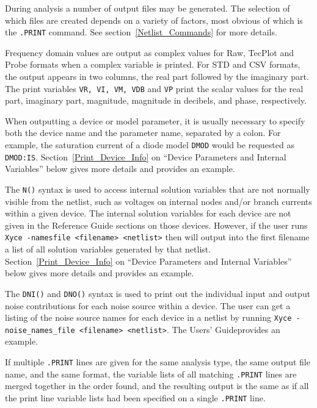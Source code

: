 \begin{Command}
\begin{XyceItemize}
\item During analysis a number of output files may be generated.  The
  selection of which files are created depends on a variety of factors,
  most obvious of which is the \texttt{.PRINT} command. See
  section~\ref{Netlist_Commands} for more details.

\item Frequency domain values are output as complex values for Raw,
  TecPlot and Probe formats when a complex variable is printed.  For STD
  and CSV formats, the output appears in two columns, the real part
  followed by the imaginary part.  The print variables 
  \texttt{VR, VI, VM, VDB} and \texttt{VP} print the scalar values 
  for the real part, imaginary part,
  magnitude, magnitude in decibels, and phase, respectively.

\item When outputting a device or model parameter, it is usually
  necessary to specify both the device name and the parameter name,
  separated by a colon.  For example, the saturation current of a
  diode model \texttt{DMOD} would be requested
  as \texttt{DMOD:IS}. Section~\ref{Print_Device_Info} on ``Device
  Parameters and Internal Variables'' below gives more details and
  provides an example.

\item The \texttt{N()} syntax is used to access internal solution variables 
that are not normally visible from the netlist, such as voltages on
internal nodes and/or branch currents within a given device.  The
internal solution variables for each \Xyce{} device are not given in
the Reference Guide sections on those devices.  However, if the user
runs \texttt{Xyce -namesfile <filename> <netlist>} then \Xyce{} will
output into the first filename a list of all solution variables
generated by that netlist.  Section~\ref{Print_Device_Info} on
``Device Parameters and Internal Variables'' below gives more details
and provides an example.

\item The \texttt{DNI()} and \texttt{DNO()} syntax is used to print out the
  individual input and output noise contributions for each noise source within
  a device. The user can get a listing of the noise source names for each device in
  a netlist by running \texttt{Xyce -noise\_names\_file <filename> <netlist>}.
  The \Xyce{} Users' Guide\UsersGuide provides an example.

\item If multiple \texttt{.PRINT} lines are given for the same analysis type,
  the same output file name, and the same format, the variable lists
  of all matching \texttt{.PRINT} lines are merged together in the order
  found, and the resulting output is the same as if all the print line
  variable lists had been specified on a single \texttt{.PRINT} line.


\end{XyceItemize}
\end{Command}
